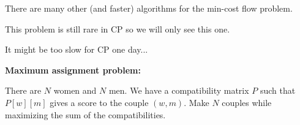 \documentclass{beamer}
\begin{document}
\begin{frame}[fragile]

There are many other (and faster) algorithms for the min-cost flow
problem. 

\vspace{0.5cm}

This problem is still rare in CP so we will only see this one.

\vspace{0.5cm}

It might be too slow for CP one day...

\end{frame}

\begin{frame}

\textbf{Maximum assignment problem:}

\vspace{0.5cm}

There are $N$ women and $N$ men. We have a compatibility matrix $P$ such that
$P[w][m]$ gives a score to the couple $(w, m)$. Make $N$ couples while
maximizing the sum of the compatibilities.

\end{frame}
\end{document}
